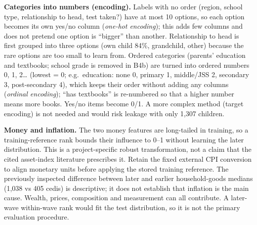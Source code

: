 \documentclass[conference,a4paper]{IEEEtran}
\begin{document}
\textbf{Categories into numbers (encoding).} Labels with no order (region, school type, relationship to head, test taken?) have at most 10 options, so each option becomes its own yes/no column (\emph{one-hot encoding}); this adds few columns and does not pretend one option is ``bigger'' than another. Relationship to head is first grouped into three options (own child 84\%, grandchild, other) because the rare options are too small to learn from. Ordered categories (parents' education and textbooks; school grade is removed in B4b) are turned into ordered numbers 0, 1, 2\ldots{} (lowest = 0; e.g.\ education: none 0, primary 1, middle/JSS 2, secondary 3, post-secondary 4), which keeps their order without adding any columns (\emph{ordinal encoding}); ``has textbooks'' is re-numbered so that a higher number means more books. Yes/no items become 0/1. A more complex method (target encoding) is not needed and would risk leakage with only 1,307 children.

\textbf{Money and inflation.} The two money features are long-tailed in training, so a training-reference rank bounds their influence to 0--1 without learning the later distribution. This is a project-specific robust transformation, not a claim that the cited asset-index literature prescribes it. Retain the fixed external CPI conversion to align monetary units before applying the stored training reference. The previously inspected difference between later and earlier household-goods medians (1,038 vs 405 cedis) is descriptive; it does not establish that inflation is the main cause. Wealth, prices, composition and measurement can all contribute. A later-wave within-wave rank would fit the test distribution, so it is not the primary evaluation procedure.
\end{document}
